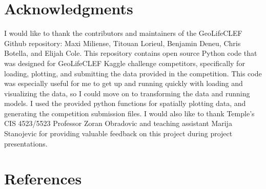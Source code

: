 \documentclass[12pt, oneside]{article}
\begin{document}
\section{Acknowledgments}
\label{Acknowledgments}

\begin{normalsize}

I would like to thank the contributors and maintainers of the GeoLifeCLEF Github repository: Maxi Miliense, Titouan Lorieul, Benjamin Deneu, Chris Botella, and Elijah Cole. This repository contains open source Python code that was designed for GeoLifeCLEF Kaggle challenge competitors, specifically for loading, plotting, and submitting the data provided in the competition. This code was especially useful for me to get up and running quickly with loading and visualizing the data, so I could move on to transforming the data and running models. I used the provided python functions for spatially plotting data, and generating the competition submission files. I would also like to thank Temple's CIS 4523/5523 Professor Zoran Obradovic and teaching assistant Marija Stanojevic for providing valuable feedback on this project during project presentations.

\end{normalsize}

\section{References}
\label{References}
\nocite{*}
\printbibliography[heading=none]
\end{document}
